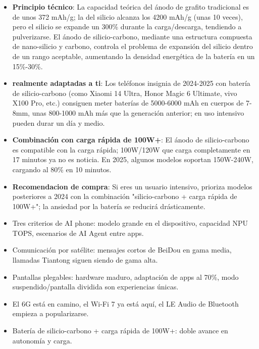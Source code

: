\begin{itemize}
  \item \textbf{Principio técnico}: La capacidad teórica del ánodo de grafito tradicional es de unos 372 mAh/g; la del silicio alcanza los 4200 mAh/g (unas 10 veces), pero el silicio se expande un 300\% durante la carga/descarga, tendiendo a pulverizarse. El ánodo de silicio-carbono, mediante una estructura compuesta de nano-silicio y carbono, controla el problema de expansión del silicio dentro de un rango aceptable, aumentando la densidad energética de la batería en un 15\%-30\%.
  \item \textbf{realmente adaptadas a ti}: Los teléfonos insignia de 2024-2025 con batería de silicio-carbono (como Xiaomi 14 Ultra, Honor Magic 6 Ultimate, vivo X100 Pro, etc.) consiguen meter baterías de 5000-6000 mAh en cuerpos de 7-8mm, unas 800-1000 mAh más que la generación anterior; en uso intensivo pueden durar un día y medio.
  \item \textbf{Combinación con carga rápida de 100W+}: El ánodo de silicio-carbono es compatible con la carga rápida; 100W/120W que carga completamente en 17 minutos ya no es noticia. En 2025, algunos modelos soportan 150W-240W, cargando al 80\% en 10 minutos.
  \item \textbf{Recomendacion de compra}: Si eres un usuario intensivo, prioriza modelos posteriores a 2024 con la combinación "silicio-carbono + carga rápida de 100W+"; la ansiedad por la batería se reducirá drásticamente.
\end{itemize}


\begin{itemize}
  \item Tres criterios de AI phone: modelo grande en el dispositivo, capacidad NPU TOPS, escenarios de AI Agent entre apps.
  \item Comunicación por satélite: mensajes cortos de BeiDou en gama media, llamadas Tiantong siguen siendo de gama alta.
  \item Pantallas plegables: hardware maduro, adaptación de apps al 70\%, modo suspendido/pantalla dividida son experiencias únicas.
  \item El 6G está en camino, el Wi-Fi 7 ya está aquí, el LE Audio de Bluetooth empieza a popularizarse.
  \item Batería de silicio-carbono + carga rápida de 100W+: doble avance en autonomía y carga.
\end{itemize}

